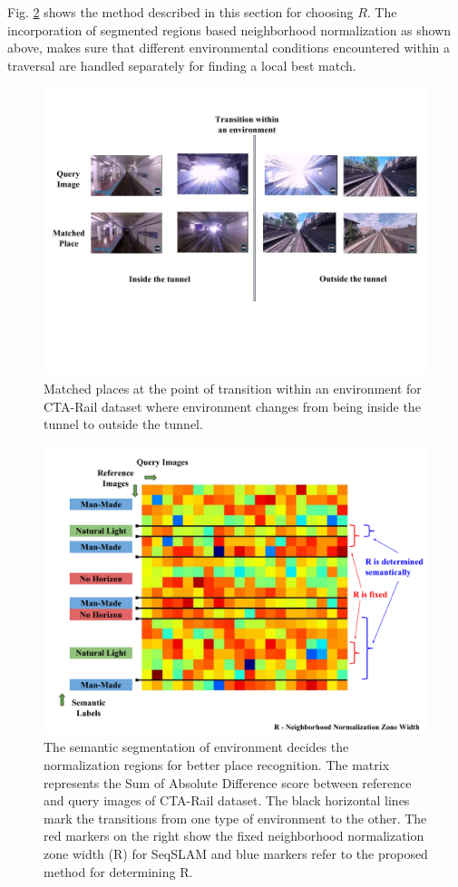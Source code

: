 \documentclass[letterpaper, 10 pt, conference]{ieeeconf}  %
\begin{document}
Fig. \ref{fig:SADmatRdisplay} shows the method described in this section for choosing $R$. The incorporation of segmented regions based neighborhood normalization as shown above, makes sure that different environmental conditions encountered within a traversal are handled separately for finding a local best match.

\begin{figure}
 \includegraphics[clip, trim=0cm 7cm 0cm 2cm,scale=0.25]{PlaceMatchesAtTransition}
 \caption{Matched places at the point of transition within an environment for CTA-Rail dataset where environment changes from being inside the tunnel to outside the tunnel.}
 \label{fig:placeMatches}
\end{figure}


\begin{figure}
 \includegraphics[scale=0.33]{SADmat-NormalisationMethod}
 \caption{The semantic segmentation of environment decides the normalization regions for better place recognition. The matrix represents the Sum of Absolute Difference score between reference and query images of CTA-Rail dataset. The black horizontal lines mark the transitions from one type of environment to the other. The red markers on the right show the fixed neighborhood normalization zone width (R) for SeqSLAM and blue markers refer to the proposed method for determining R.}
 \label{fig:SADmatRdisplay}
\end{figure}
\end{document}
